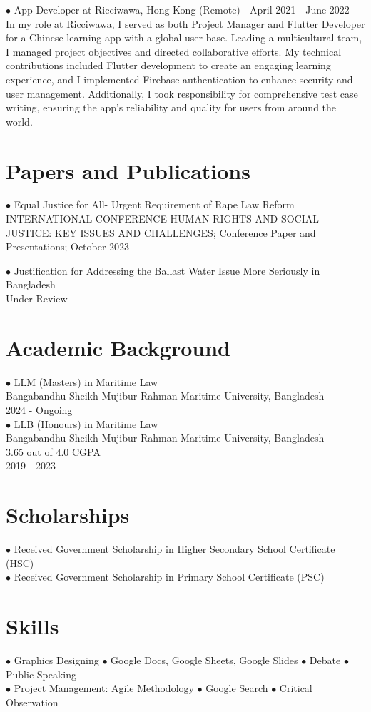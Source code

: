 \documentclass{class}
\begin{document}
$\bullet$ App Developer at Ricciwawa, Hong Kong (Remote) | April 2021 - June
2022\\
\leftskip 10pt
In my role at Ricciwawa, I served as both Project Manager and Flutter Developer
for a Chinese learning app with a global user base. Leading a multicultural
team, I managed project objectives and directed collaborative efforts. My
technical contributions included Flutter development to create an engaging
learning experience, and I implemented Firebase authentication to enhance
security and user management. Additionally, I took responsibility for
comprehensive test case writing, ensuring the app's reliability and quality for
users from around the world.\\
\leftskip 0pt

\section{Papers and Publications}
$\bullet$ Equal Justice for All- Urgent Requirement of Rape Law Reform\\
\leftskip 10pt
INTERNATIONAL CONFERENCE HUMAN RIGHTS AND SOCIAL JUSTICE: KEY ISSUES AND
CHALLENGES; Conference Paper and Presentations; October 2023\\
\leftskip 0pt

$\bullet$ Justification for Addressing the Ballast Water Issue More Seriously in
Bangladesh\\
\leftskip 10pt
Under Review\\
\leftskip 0pt

\section{Academic Background}
$\bullet$ LLM (Masters) in Maritime Law\\
\leftskip 10pt
Bangabandhu Sheikh Mujibur Rahman Maritime University, Bangladesh\\
2024 - Ongoing\\
\leftskip 0pt
$\bullet$ LLB (Honours) in Maritime Law\\
\leftskip 10pt
Bangabandhu Sheikh Mujibur Rahman Maritime University, Bangladesh\\
3.65 out of 4.0 CGPA\\
2019 - 2023\\
\leftskip 0pt

\section{Scholarships}
$\bullet$ Received Government Scholarship in Higher Secondary School Certificate
(HSC)\\
$\bullet$ Received Government Scholarship in Primary School Certificate (PSC)

\section{Skills}
$\bullet$ Graphics Designing
$\bullet$ Google Docs, Google Sheets, Google Slides
$\bullet$ Debate
$\bullet$ Public Speaking\\
$\bullet$ Project Management: Agile Methodology
$\bullet$ Google Search
$\bullet$ Critical Observation
\end{document}
